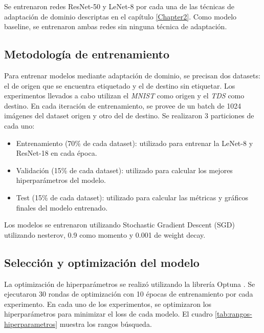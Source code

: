 Se entrenaron redes ResNet-50 \parencite{he2016deep} y LeNet-8 \parencite{lecun1998gradient} por cada una de las t\'ecnicas de adaptaci\'on de dominio descriptas en el cap\'itulo
\ref{Chapter2}. Como modelo baseline, se entrenaron ambas redes sin ninguna t\'ecnica de adaptaci\'on.

\subsection{Metodolog\'ia de entrenamiento}

Para entrenar modelos mediante adaptaci\'on de dominio, se precisan dos datasets: el de origen que se encuentra
etiquetado y el de destino sin etiquetar. Los experimentos llevados a cabo utilizan el {\it MNIST} como origen y el
    {\it TDS} como destino. En cada iteraci\'on de entrenamiento, se provee de un batch de 1024 im\'agenes del dataset
origen y otro del de destino. Se realizaron 3 particiones de cada uno:

\begin{itemize}
    \item Entrenamiento (70\% de cada dataset): utilizado para entrenar la LeNet-8 y ResNet-18 en cada \'epoca.
    \item Validaci\'on (15\% de cada dataset): utilizado para calcular los mejores hiperpar\'ametros del modelo.
    \item Test (15\% de cada dataset): utilizado para calcular las m\'etricas y gr\'aficos finales del modelo entrenado.
\end{itemize}

Los modelos se entrenaron utilizando Stochastic Gradient Descent (SGD) \parencite{sutskever2013importance} utilizando nesterov, 0.9 como momento y 0.001 de weight decay.

\subsection{Selecci\'on y optimizaci\'on del modelo}

La optimizaci\'on de hiperpar\'ametros se realiz\'o utilizando la librer\'ia Optuna \parencite{optuna_2019}. Se ejecutaron 30 rondas de optimizaci\'on con 10 \'epocas de entrenamiento por cada experimento.
En cada uno de los experimentos, se optimizaron los hiperpar\'ametros para minimizar el loss de cada modelo. El cuadro
\ref{tab:rangos-hiperparametros} muestra los rangos b\'usqueda.

